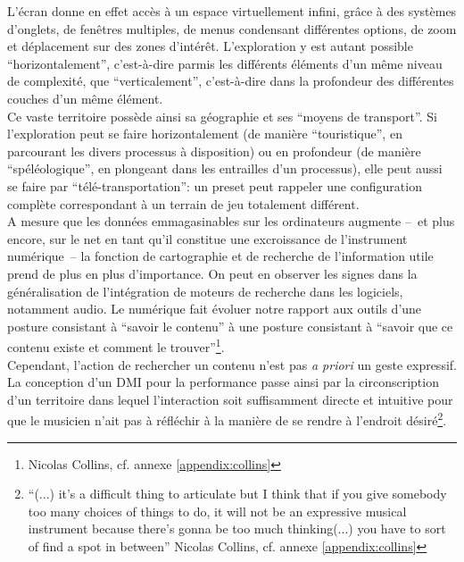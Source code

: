 \noindent L'écran donne en effet accès à un espace virtuellement infini, grâce à des systèmes d'onglets, de fenêtres multiples, de menus condensant différentes options, de zoom et déplacement sur des zones d'intérêt. L'exploration y est autant possible ``horizontalement'', c'est-à-dire parmis les différents éléments d'un même niveau de complexité, que ``verticalement'', c'est-à-dire dans la profondeur des différentes couches d'un même élément.\\
\indent Ce vaste territoire possède ainsi sa géographie et ses ``moyens de transport''. Si l'exploration peut se faire horizontalement (de manière ``touristique'', en parcourant les divers processus à disposition) ou en profondeur (de manière ``spéléologique'', en plongeant dans les entrailles d'un processus), elle peut aussi se faire par ``télé-transportation'': un preset peut rappeler une configuration complète correspondant à un terrain de jeu totalement différent.\\
\indent A mesure que les données emmagasinables sur les ordinateurs augmente --~et plus encore, sur le net en tant qu'il constitue une excroissance de l'instrument numérique~-- la fonction de cartographie et de recherche de l'information utile prend de plus en plus d'importance. On peut en observer les signes dans la généralisation de l'intégration de moteurs de recherche dans les logiciels, notamment audio. Le numérique fait évoluer notre rapport aux outils d'une posture consistant à ``savoir le contenu'' à une posture consistant à ``savoir que ce contenu existe et comment le trouver''\footnote{ Nicolas Collins, cf. annexe \ref{appendix:collins}}.\\
\indent Cependant, l'action de rechercher un contenu n'est pas \textit{a priori} un geste expressif. La conception d'un \gls{DMI} pour la performance passe ainsi par la circonscription d'un territoire dans lequel l'interaction soit suffisamment directe et intuitive pour que le musicien n'ait pas à réfléchir à la manière de se rendre à l'endroit désiré\footnote{``(...) it's a difficult thing to articulate but I think that if you give somebody too many choices of things to do, it will not be an expressive musical instrument because there's gonna be too much thinking(...) you have to sort of find a spot in between'' Nicolas Collins, cf. annexe \ref{appendix:collins}}.

